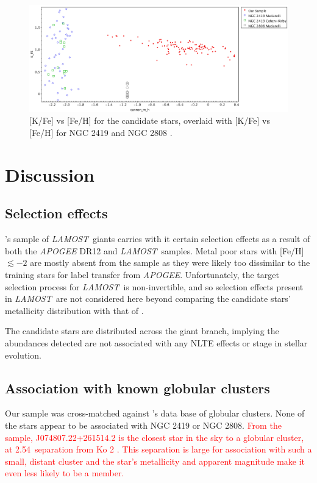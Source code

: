\documentclass[a4paper,fleqn,usenatbib]{mnras}
\newcommand{\todo}[1]{\textcolor{red}{#1}}
\newcommand{\project}[1]{\emph{#1}}
\newcommand{\lamost}{\project{LAMOST}}
\begin{document}
\begin{figure}
	\includegraphics[width=\columnwidth]{KvsFe.png}
    \caption{[K/Fe] vs [Fe/H] for the candidate stars, overlaid with [K/Fe] vs [Fe/H] for NGC 2419 and NGC 2808 \citep{cohenkirby2012, mucciarelli2012, mucciarelli2015}.}
    \label{KvsFe}
\end{figure}

\section{Discussion}
\label{sec:discussion}

\subsection{Selection effects}
\label{sec:selectioneffects}
\cite{ho2017}'s sample of \lamost\ giants carries with it certain selection effects as a result of both the \textit{APOGEE} DR12 and \lamost\ samples. Metal poor stars with [Fe/H] $\lesssim-2$ are mostly absent from the sample as they were likely too dissimilar to the training stars for label transfer from \textit{APOGEE}. Unfortunately, the target selection process for \lamost\ is non-invertible, and so selection effects present in \lamost\ are not considered here beyond comparing the candidate stars' metallicity distribution with that of \cite{ho2017}.

The candidate stars are distributed across the giant branch, implying the abundances detected are not associated with any NLTE effects or stage in stellar evolution.

\subsection{Association with known globular clusters}
\label{sec:globclustasoc}
Our sample was cross-matched against \cite{harris1996}'s data base of globular clusters. None of the stars appear to be associated with NGC 2419 or NGC 2808. \todo{ From the sample, J074807.22+261514.2 is the closest star in the sky to a globular cluster, at 2.54\degree\ separation from Ko 2 \citep{koposov2007}. This separation is large for association with such a small, distant cluster and the star's metallicity and apparent magnitude make it even less likely to be a member.}
\end{document}
